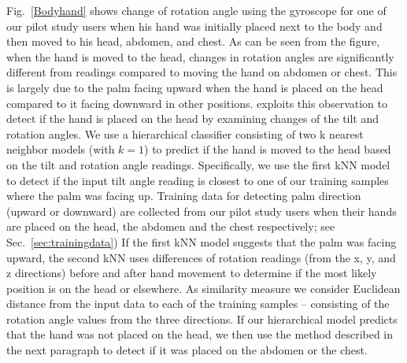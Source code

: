   Fig.~\ref{Bodyhand} shows change of rotation angle using the gyroscope for one of our pilot study
users when his hand was initially placed next to the body and then moved to his head, abdomen, and chest. As can be seen from the figure,
when the hand is moved to the head, changes in rotation angles are significantly different from readings {compared to moving the hand on
abdomen or chest}. This is largely due to the {palm facing upward when the hand is placed on the head compared to it facing downward in
other positions}. {\systemname} exploits this observation to detect if the hand is placed on the head by examining changes of the {tilt}
and rotation angles. We use a hierarchical classifier consisting of two {k nearest neighbor} models (with $k=1$) to predict if the hand is
moved to the head based on the tilt and rotation angle readings. Specifically, we use the first kNN model to detect if the input tilt angle
reading is closest to one of our training samples where the palm was {facing up. Training data for detecting palm direction (upward or
downward) are collected} from our pilot study users when their hands are placed on the head, the abdomen and the chest respectively; see
Sec.~\ref{sec:trainingdata}) If the first kNN model suggests that the palm was facing upward, {the second kNN uses differences of rotation
readings (from the x, y, and z directions) before and after hand  movement to determine if the most likely position is on the head or
elsewhere. As similarity measure we consider}  Euclidean distance from the input data to each of the training samples -- consisting of the
rotation angle values from the three directions. If our hierarchical model predicts that the hand was not placed on the head, we then use
the method described in the next paragraph to detect if it was placed on the abdomen or the chest.

